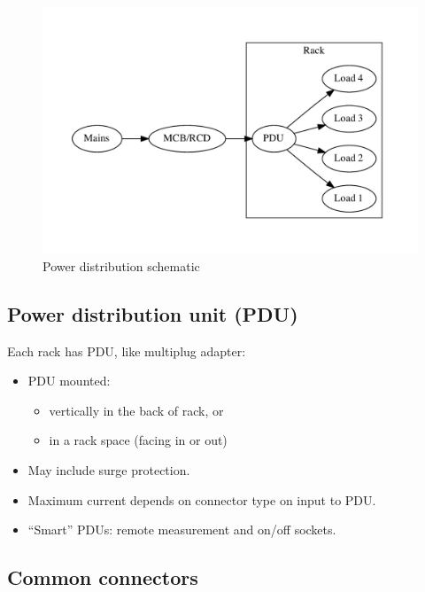 \documentclass{pgslides}
\begin{document}
\begin{frame}{\insertsectionhead}
\begin{figure}[htbp]
  \centering
  \includegraphics[width=1.0\linewidth]{power_distribution_diagram}
  \caption{Power distribution schematic}
  \label{fig:power-distribution}
\end{figure}
\end{frame}

\subsection{Power distribution unit (PDU)}

\begin{frame}{\insertsubsectionhead}
Each rack has PDU, like multiplug adapter:
\begin{itemize}
\item PDU mounted:
  \begin{itemize}
  \item vertically in the back of rack, or
  \item in a rack space (facing in or out)
  \end{itemize}
\item May include surge protection.
\item Maximum current depends on connector type on input to PDU.
\item ``Smart'' PDUs: remote measurement and on/off sockets.
\end{itemize}
\end{frame}

\subsection{Common connectors}
\end{document}
